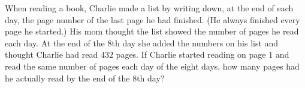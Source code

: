 When reading a book, Charlie made a list by writing down, at the end of each day, the page number of the last page he had finished. (He always finished every page he started.) His mom thought the list showed the number of pages he read each day. At the end of the $8$th day she added the numbers on his list and thought Charlie had read $432$ pages. If Charlie started reading on page $1$ and read the same number of pages each day of the eight days, how many pages had he actually read by the end of the $8$th day?
